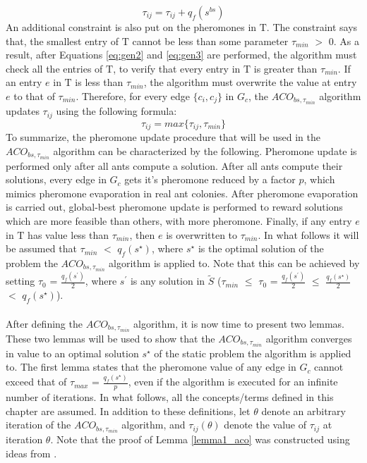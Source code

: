 \documentclass[12pt]{article}
\numberwithin{equation}{subsection}
\numberwithin{table}{subsection}
\numberwithin{algorithm}{subsection}
\numberwithin{figure}{subsection}
\begin{document}
\begin{equation}
  \label{eq:gen3}
  \tau_{ij}= \tau_{ij} + q_f(s^{bs})
\end{equation}
An additional constraint is also put on the pheromones in $\mathrm{T}$. The constraint says that, the smallest entry of $\mathrm{T}$ cannot be less than some parameter $\tau_{min}$ $>$ 0. As a result, after Equations \ref{eq:gen2} and \ref{eq:gen3} are performed, the algorithm must check all the entries of $\mathrm{T}$, to verify that every entry in $\mathrm{T}$ is greater than $\tau_{min}$. If an entry $e$ in $\mathrm{T}$ is less than $\tau_{min}$, the algorithm must overwrite the value at entry $e$ to that of $\tau_{min}$. Therefore, for every edge $\{c_i, c_j\}$ in $G_c$, the $ACO_{bs, \tau_{min}}$ algorithm updates $\tau_{ij}$ using the following formula:
\begin{equation}
  \label{eq:gen4}
  \tau_{ij}= max\{\tau_{ij}, \tau_{min}\}
\end{equation}
To summarize, the pheromone update procedure that will be used in the $ACO_{bs, \tau_{min}}$ algorithm can be characterized by the following. Pheromone update is performed only after all ants compute a solution. After all ants compute their solutions, every edge in $G_c$ gets it's pheromone reduced by a factor $p$, which mimics pheromone evaporation in real ant colonies. After pheromone evaporation is carried out, global-best pheromone update is performed to reward solutions which are more feasible than others, with more pheromone. Finally, if any entry $e$ in $\mathrm{T}$ has value less than $\tau_{min}$, then $e$ is overwritten to $\tau_{min}$. In what follows it will be assumed that $\tau_{min}$ $<$ $q_f(s^\star)$, where $s^\star$ is the optimal solution of the problem the $ACO_{bs, \tau_{min}}$ algorithm is applied to. Note that this can be achieved by setting $\tau_0$ = $\frac{q_f(s^\prime)}{2}$, where $s^\prime$ is any solution in $\widetilde{S}$ ($\tau_{min}$ $\leq$ $\tau_0$ =  $\frac{q_f(s^\prime)}{2}$ $\leq$ $\frac{q_f(s^\star)}{2}$ $<$ $q_f(s^\star)$). \cite{dorigo_stutzle_thomas_2004}\\\\
After defining the $ACO_{bs, \tau_{min}}$ algorithm, it is now time to present two lemmas. These two lemmas will be used to show that the $ACO_{bs, \tau_{min}}$ algorithm converges in value to an optimal solution $s^\star$ of the static problem the algorithm is applied to. The first lemma states that the pheromone value of any edge in $G_c$ cannot exceed that of $\tau_{max}$ = $\frac{q_f(s^\star)}{p}$, even if the algorithm is executed for an infinite number of iterations. In what follows, all the concepts/terms defined in this chapter are assumed. In addition to these definitions, let $\theta$ denote an arbitrary iteration of the $ACO_{bs, \tau_{min}}$ algorithm, and $\tau_{ij}(\theta)$ denote the value of $\tau_{ij}$ at iteration $\theta$. Note that the proof of Lemma \ref{lemma1_aco} was constructed using ideas from \cite{dorigo_stutzle_thomas_2004}.
\end{document}
